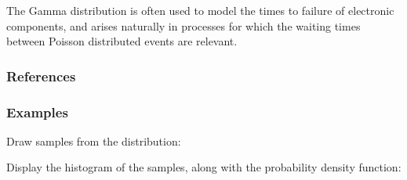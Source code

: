 \documentclass[letterpaper,10pt,english]{sphinxmanual}
\begin{document}
\begin{fulllineitems}
\sphinxAtStartPar
The Gamma distribution is often used to model the times to failure of
electronic components, and arises naturally in processes for which the
waiting times between Poisson distributed events are relevant.
\subsubsection*{References}
\subsubsection*{Examples}

\sphinxAtStartPar
Draw samples from the distribution:

\begin{sphinxVerbatim}[commandchars=\\\{\}]
      
    
\end{sphinxVerbatim}

\sphinxAtStartPar
Display the histogram of the samples, along with
the probability density function:

\begin{sphinxVerbatim}[commandchars=\\\{\}]
   
     
      
     
                     
     
\end{sphinxVerbatim}

\end{fulllineitems}
\end{document}
